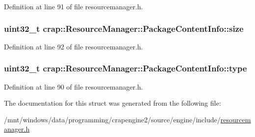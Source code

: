 Definition at line 91 of file resourcemanager.\+h.

\hypertarget{structcrap_1_1_resource_manager_1_1_package_content_info_a44623b6eae3303892db7cc79fbd1b29d}{
\subsubsection[{size}]{\setlength{\rightskip}{0pt plus 5cm}uint32\+\_\+t crap\+::\+Resource\+Manager\+::\+Package\+Content\+Info\+::size}}\label{structcrap_1_1_resource_manager_1_1_package_content_info_a44623b6eae3303892db7cc79fbd1b29d}


Definition at line 92 of file resourcemanager.\+h.

\hypertarget{structcrap_1_1_resource_manager_1_1_package_content_info_aa44d918f7f16824c05c04466d6823c26}{
\subsubsection[{type}]{\setlength{\rightskip}{0pt plus 5cm}uint32\+\_\+t crap\+::\+Resource\+Manager\+::\+Package\+Content\+Info\+::type}}\label{structcrap_1_1_resource_manager_1_1_package_content_info_aa44d918f7f16824c05c04466d6823c26}


Definition at line 90 of file resourcemanager.\+h.



The documentation for this struct was generated from the following file\+:\begin{DoxyCompactItemize}
\item 
/mnt/windows/data/programming/crapengine2/source/engine/include/\hyperlink{resourcemanager_8h}{resourcemanager.\+h}\end{DoxyCompactItemize}
